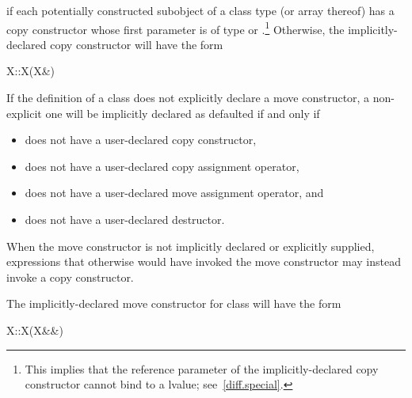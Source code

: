 if each potentially constructed subobject of a class type
(or array thereof)
has a copy constructor whose first parameter is of type
or
.\footnote{This implies that the reference parameter of the
implicitly-declared copy constructor
cannot bind to a
lvalue; see~\ref{diff.special}.}
Otherwise, the implicitly-declared copy constructor will have the form

\begin{codeblock}
X::X(X&)
\end{codeblock}

\pnum
{}%
If the definition of a class  does not explicitly declare
a move constructor, a non-explicit one will be
implicitly declared as defaulted if and only if

\begin{itemize}
\item
{} does not have a user-declared copy constructor,

\item
{} does not have a user-declared copy assignment operator,

\item
{} does not have a user-declared move assignment operator, and

\item
{} does not have a user-declared destructor.
\end{itemize}

\begin{note} When the move constructor is not implicitly declared or explicitly supplied,
expressions that otherwise would have invoked the move constructor may instead invoke
a copy constructor. \end{note}

\pnum
The implicitly-declared move constructor for class  will have the form
\begin{codeblock}
X::X(X&&)
\end{codeblock}


